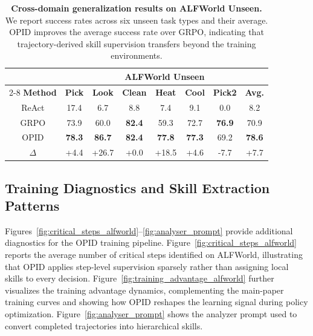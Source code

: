 \documentclass{llmxive}
\providecommand{\arraystretch}{1.08}
\begin{document}
\begin{table}[ht!]
\centering
\vspace{0.05in}
\label{tab:ood_generalization_alfworld}
\small
\setlength{\tabcolsep}{9pt}
\renewcommand{\arraystretch}{1.08}
\begin{tabular}{cccccccc}
\toprule[1.2pt]
& \multicolumn{7}{c}{\textbf{ALFWorld Unseen}} \\
\cmidrule(lr){2-8}
\textbf{Method} & \textbf{Pick} & \textbf{Look} & \textbf{Clean} & \textbf{Heat} & \textbf{Cool} & \textbf{Pick2} & \textbf{Avg.} \\
\midrule
ReAct        & 17.4 & 6.7  & 8.8  & 7.4  & 9.1  & 0.0  & 8.2  \\
GRPO         & 73.9 & 60.0 & \textbf{82.4} & 59.3 & 72.7 & \textbf{76.9} & 70.9 \\
\rowcolor{gray!10}
OPID         & \textbf{78.3} & \textbf{86.7} & \textbf{82.4} & \textbf{77.8} & \textbf{77.3} & 69.2 & \textbf{78.6} \\
\rowcolor{blue!6}
$\Delta$     & +4.4 & +26.7 & +0.0 & +18.5 & +4.6 & -7.7 & +7.7 \\
\bottomrule[1.2pt]
\end{tabular}
\caption{\textbf{Cross-domain generalization results on ALFWorld Unseen.} We report success rates across six unseen task types and their average. OPID improves the average success rate over GRPO, indicating that trajectory-derived skill supervision transfers beyond the training environments.}
\end{table}

\subsection{Training Diagnostics and Skill Extraction Patterns}
\label{app:training_diagnostics}
Figures~\ref{fig:critical_steps_alfworld}--\ref{fig:analyser_prompt} provide additional diagnostics for the OPID training pipeline. Figure~\ref{fig:critical_steps_alfworld} reports the average number of critical steps identified on ALFWorld, illustrating that OPID applies step-level supervision sparsely rather than assigning local skills to every decision. Figure~\ref{fig:training_advantage_alfworld} further visualizes the training advantage dynamics, complementing the main-paper training curves and showing how OPID reshapes the learning signal during policy optimization. Figure~\ref{fig:analyser_prompt} shows the analyzer prompt used to convert completed trajectories into hierarchical skills.
\end{document}
